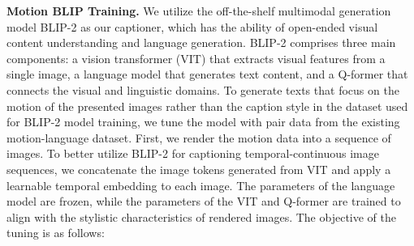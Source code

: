\documentclass[letterpaper]{article} \usepackage{aaai24}
\begin{document}
\noindent\textbf{Motion BLIP Training.} We utilize the off-the-shelf multimodal generation model BLIP-2 \cite{li2023blip2} as our captioner, which has the ability of open-ended visual content understanding and language generation. BLIP-2 comprises three main components: a vision transformer (VIT) that extracts visual features from a single image, a language model that generates text content, and a Q-former that connects the visual and linguistic domains. To generate texts that focus on the motion of the presented images rather than the caption style in the dataset used for BLIP-2 model training, we tune the model with pair data from the existing motion-language dataset. First, we render the motion data into a sequence of images. To better utilize BLIP-2 for captioning temporal-continuous image sequences, we concatenate the image tokens generated from VIT and apply a learnable temporal embedding to each image. The parameters of the language model are frozen, while the parameters of the VIT and Q-former are trained to align with the stylistic characteristics of rendered images. The objective of the tuning is as follows:
\end{document}
